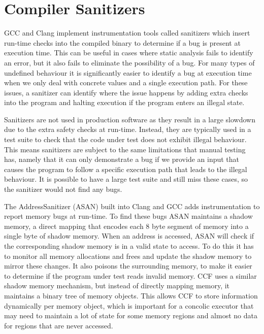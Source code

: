\documentclass[12pt,twoside]{report}
\begin{document}
\section{Compiler Sanitizers}
GCC and Clang implement instrumentation tools called sanitizers which insert run-time checks into the compiled binary to determine if a bug is present at execution time. This can be useful in cases where static analysis fails to identify an error, but it also fails to eliminate the possibility of a bug. For many types of undefined behaviour it is significantly easier to identify a bug at execution time when we only deal with concrete values and a single execution path. For these issues, a sanitizer can identify where the issue happens by adding extra checks into the program and halting execution if the program enters an illegal state.

Sanitizers are not used in production software as they result in a large slowdown due to the extra safety checks at run-time. Instead, they are typically used in a test suite to check that the code under test does not exhibit illegal behaviour. This means sanitizers are subject to the same limitations that manual testing has, namely that it can only demonstrate a bug if we provide an input that causes the program to follow a specific execution path that leads to the illegal behaviour. It is possible to have a large test suite and still miss these cases, so the sanitizer would not find any bugs.

The AddressSanitizer \cite{180957} (ASAN) built into Clang and GCC adds instrumentation to report memory bugs at run-time. To find these bugs ASAN maintains a shadow memory, a direct mapping that encodes each 8 byte segment of memory into a single byte of shadow memory. When an address is accessed, ASAN will check if the corresponding shadow memory is in a valid state to access. To do this it has to monitor all memory allocations and frees and update the shadow memory to mirror these changes. It also poisons the surrounding memory, to make it easier to determine if the program under test reads invalid memory. CCF uses a similar shadow memory mechanism, but instead of directly mapping memory, it maintains a binary tree of memory objects. This allows CCF to store information dynamically per memory object, which is important for a concolic executor that may need to maintain a lot of state for some memory regions and almost no data for regions that are never accessed.
\end{document}
